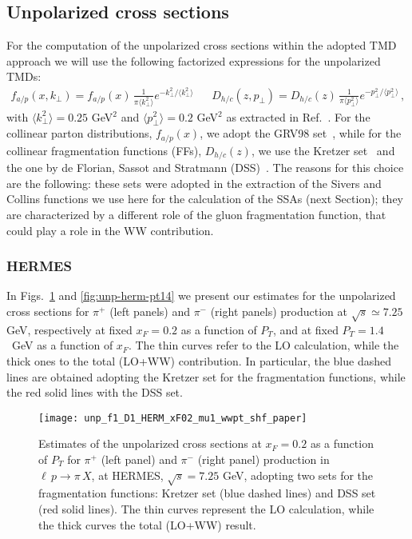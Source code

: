 \documentclass[nofootinbib,superscriptaddress,aps]{revtex4}
\newcommand{\bea}{\begin{eqnarray}}
\newcommand{\eea}{\end{eqnarray}}
\begin{document}
\subsection{Unpolarized cross sections}

For the computation of the unpolarized cross sections within the adopted TMD approach we will use the following factorized expressions for the unpolarized TMDs:
\bea
\label{TMDs}
f_{a/p}(x,k_\perp) =  f_{a/p}(x)\, \frac{1}{\pi \langle k_\perp^2\rangle} e^{-k_\perp^2/\langle k_\perp^2\rangle} &&
D_{h/c}(z,p_\perp)  =  D_{h/c}(z)\, \frac{1}{\pi \langle p_\perp^2\rangle} e^{-p_\perp^2/\langle p_\perp^2\rangle}\,,
\eea
with $\langle k_\perp^2\rangle=0.25$ GeV$^2$ and $\langle p_\perp^2\rangle=0.2$ GeV$^2$ as extracted in Ref.~\cite{Anselmino:2005nn}.
For the collinear parton distributions, $f_{a/p}(x)$, we adopt the GRV98 set~\cite{Gluck:1998xa}, while for the collinear fragmentation functions (FFs), $D_{h/c}(z)$, we use the Kretzer set~\cite{Kretzer:2000yf} and the one by de Florian, Sassot and Stratmann (DSS)~\cite{deFlorian:2007aj}. The reasons for this choice are the following: these sets were adopted in the extraction of the Sivers and Collins functions we use here for the calculation of the SSAs (next Section); they are characterized by a different role of the gluon fragmentation function, that could play a role in the WW contribution.


\subsubsection{HERMES}
\label{unp-hermes}

In Figs.~\ref{fig:unp-herm-xf02} and \ref{fig:unp-herm-pt14} we present our estimates for the unpolarized cross sections for $\pi^+$ (left panels) and $\pi^-$ (right panels) production at $\sqrt s\simeq 7.25$ GeV, respectively at fixed $x_F=0.2$ as a function of $P_T$, and at fixed $P_T=1.4$~GeV as a function of $x_F$. The thin curves refer to the LO calculation, while the thick ones to the total (LO+WW) contribution. In particular, the blue dashed lines are obtained adopting the Kretzer set for the fragmentation functions, while the red solid lines with the DSS set.


\begin{figure}[ht!]
 \begin{center}
 \texttt{[image: unp\_f1\_D1\_HERM\_xF02\_mu1\_wwpt\_shf\_paper]}
\end{center}
 \caption{Estimates of the unpolarized cross sections at $x_F=0.2$ as a function of $P_T$ for $\pi^+$ (left panel) and $\pi^-$ (right panel) production in $\ell\, p\to \pi\,X$, at HERMES, $\sqrt{s} = 7.25$ GeV, adopting two sets for the fragmentation functions: Kretzer set (blue dashed lines) and DSS set (red solid lines). The thin curves represent the LO calculation, while the thick curves the total (LO+WW) result.}
  \label{fig:unp-herm-xf02}
\end{figure}
\end{document}

